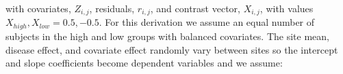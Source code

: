 with covariates, $Z_{i,j}$, residuals, $r_{i,j}$, and contrast vector, $X_{i,j}$, with values $X_{high}, X_{low} = 0.5,-0.5$. For this derivation we assume an equal number of subjects in the high and low groups with balanced covariates. The site mean, disease effect, and covariate effect randomly vary between sites so the intercept and slope coefficients become dependent variables \cite{Raudenbush2000} and we assume: